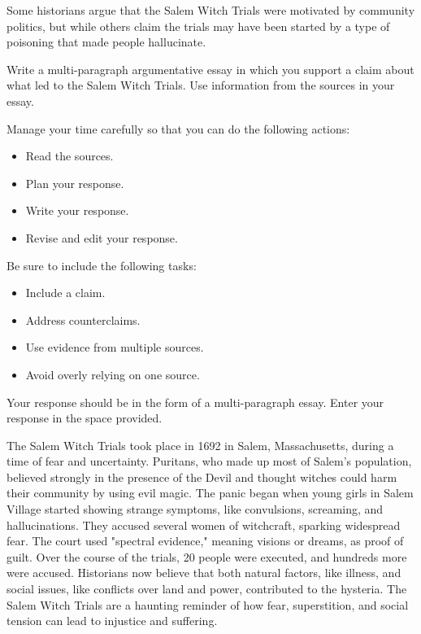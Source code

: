 \documentclass[12pt]{article}
\begin{document}
\vspace{1em}
\begin{tcolorbox}[colframe=black!60, colback=white, 
coltitle=black, colbacktitle=black!15, fonttitle=\bfseries\Large, 
title=Example Test Prompt, halign title=center, left=10pt, right=10pt, top=10pt, bottom=15pt]
Some historians argue that the Salem Witch Trials were motivated by community politics, but while others claim the trials may have been started by a type of poisoning that made people hallucinate.

Write a multi-paragraph argumentative essay in which you support a claim about what led to the Salem Witch Trials. Use information from the sources in your essay.

Manage your time carefully so that you can do the following actions:
\begin{itemize}
    \item Read the sources.
    \item Plan your response.
    \item Write your response.
    \item Revise and edit your response.
\end{itemize}
Be sure to include the following tasks:
\begin{itemize}
    \item Include a claim.
    \item Address counterclaims.
    \item Use evidence from multiple sources.
    \item Avoid overly relying on one source.
\end{itemize}
Your response should be in the form of a multi-paragraph essay. Enter your response in the space provided.
\end{tcolorbox}

\vspace{1em}

\begin{tcolorbox}[colframe=black!60, colback=white, 
coltitle=black, colbacktitle=black!15, fonttitle=\bfseries\Large, 
title=Source 1: Understanding the History of the Salem Witch Trials, halign title=center, left=10pt, right=10pt, top=10pt, bottom=15pt]
The Salem Witch Trials took place in 1692 in Salem, Massachusetts, during a time of fear and uncertainty. Puritans, who made up most of Salem’s population, believed strongly in the presence of the Devil and thought witches could harm their community by using evil magic. The panic began when young girls in Salem Village started showing strange symptoms, like convulsions, screaming, and hallucinations. They accused several women of witchcraft, sparking widespread fear. The court used "spectral evidence," meaning visions or dreams, as proof of guilt. Over the course of the trials, 20 people were executed, and hundreds more were accused. Historians now believe that both natural factors, like illness, and social issues, like conflicts over land and power, contributed to the hysteria. The Salem Witch Trials are a haunting reminder of how fear, superstition, and social tension can lead to injustice and suffering. 

 
\end{tcolorbox}
\end{document}
